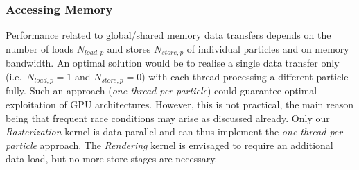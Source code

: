 \documentclass[preprint,5pt]{elsarticle}
\begin{document}
\subsubsection{Accessing Memory}
Performance related to global/shared memory data transfers depends on the number of loads $N_{load,p}$ and stores $N_{store,p}$ of individual particles and on memory bandwidth.
An optimal solution would be to realise a single data transfer only
(i.e.\ $N_{load,p} = 1$ and $N_{store,p} = 0$) with each thread processing a different particle fully. Such an approach ({\it one-thread-per-particle}) could guarantee optimal exploitation of GPU architectures. However,
 this is not practical, the main reason being that frequent race conditions may arise as discussed already.
Only our {\it Rasterization} kernel is data parallel and can thus implement the {\it one-thread-per-particle} approach. 
The {\it Rendering} kernel is envisaged to require an additional data load, but no more store 
stages are necessary.
\end{document}
